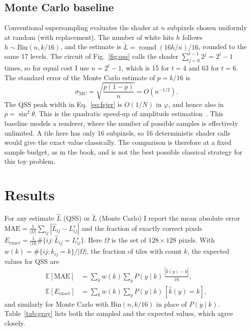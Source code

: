 \documentclass[10pt,twocolumn,a4paper]{article}
\DeclareMathOperator{\round}{round}
\newcommand{\Eex}{E_{\mathrm{exact}}}
\begin{document}
\subsection{Monte Carlo baseline}
Conventional supersampling evaluates the shader at $n$ subpixels chosen
uniformly at random (with replacement). The number of white hits $h$ follows
$h\sim\mathrm{Bin}(n,k/16)$, and the estimate is
$\tilde L=\round(16h/n)/16$, rounded to the same 17 levels.
The circuit of Fig.~\ref{fig:qss} calls the shader
$\sum_{j=0}^{t-1}2^j=2^t-1$ times, so for equal cost I use $n=2^t-1$,
which is 15 for $t=4$ and 63 for $t=6$. The standard error of the Monte Carlo
estimate of $p=k/16$ is
\begin{equation}
\sigma_{\mathrm{MC}}=\sqrt{\frac{p(1-p)}{n}}=O(n^{-1/2}).
\end{equation}
The QSS peak width in Eq.~\eqref{eq:fejer} is $O(1/N)$ in $\varphi$, and hence
also in $p=\sin^2\theta$. This is the quadratic speed-up of amplitude
estimation~\cite{brassard}.
This baseline models a renderer, where the number of possible samples is
effectively unlimited. A tile here has only 16 subpixels, so 16 deterministic
shader calls would give the exact value classically. The comparison is
therefore at a fixed sample budget, as in the book, and is not the best
possible classical strategy for this toy problem.

\section{Results}\label{sec:results}

For any estimate $\hat L$ (QSS) or $\tilde L$ (Monte Carlo) I report the mean
absolute error
$\mathrm{MAE}=\frac{1}{|\Omega|}\sum_{ij}|\hat L_{ij}-L^{\star}_{ij}|$ and the
fraction of exactly correct pixels
$\Eex=\frac{1}{|\Omega|}\#\{ij:\hat L_{ij}=L^\star_{ij}\}$. Here $\Omega$ is the
set of $128\times128$ pixels. With $w(k)=\#\{ij:k_{ij}=k\}/|\Omega|$, the
fraction of tiles with count $k$, the expected values for QSS are
\begin{align}
\mathbb E[\mathrm{MAE}]&=\sum_{k}w(k)\sum_{y}P(y\mid k)\,\frac{|\hat k(y)-k|}{16},\\
\mathbb E[\Eex]&=\sum_k w(k)\sum_y P(y\mid k)\,[\hat k(y)=k],
\end{align}
and similarly for Monte Carlo with $\mathrm{Bin}(n,k/16)$ in place of
$P(y\mid k)$. Table~\ref{tab:gray} lists both the sampled and the expected
values, which agree closely.
\end{document}
